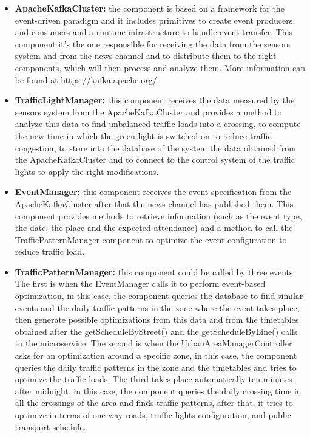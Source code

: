 \documentclass[12pt, a4paper, twoside, openright]{report}
\begin{document}
\begin{itemize}
\item
  \textbf{ApacheKafkaCluster:} the component is based on a framework for
  the event-driven paradigm and it includes primitives to create event
  producers and consumers and a runtime infrastructure to handle event
  transfer. This component it's the one responsible for receiving the data
  from the sensors system and from the news channel and to distribute
  them to the right components, which will then process and analyze them.
  More information can be found at \url{https://kafka.apache.org/}.
\item
  \textbf{TrafficLightManager:} this component receives the data
  measured by the sensors system from the ApacheKafkaCluster and
  provides a method to analyze this data to find unbalanced traffic loads
  into a crossing, to compute the new time in which the green light is
  switched on to reduce traffic congestion, to store into the database
  of the system the data obtained from the ApacheKafkaCluster and to
  connect to the control system of the traffic lights to apply the right
  modifications.
\item
  \textbf{EventManager:} this component receives the event specification
  from the ApacheKafkaCluster after that the news channel has published
  them. This component provides methods to retrieve information (such
  as the event type, the date, the place and the expected attendance)
  and a method to call the TrafficPatternManager component to optimize
  the event configuration to reduce traffic load.
\item
  \textbf{TrafficPatternManager:} this component could be called by
  three events. The first is when the EventManager calls it to perform
  event-based optimization, in this case, the component queries the
  database to find similar events and the daily traffic patterns in the
  zone where the event takes place, then generate possible optimizations
  from this data and from the timetables obtained after the
  getScheduleByStreet() and the getScheduleByLine() calls to the
  microservice. The second is when the UrbanAreaManagerController asks
  for an optimization around a specific zone, in this case, the component
  queries the daily traffic patterns in the zone and the timetables and
  tries to optimize the traffic loads. The third takes place
  automatically ten minutes after midnight, in this case, the
  component queries the daily crossing time in all the crossings of the
  area and finds traffic patterns, after that, it tries to optimize in
  terms of one-way roads, traffic lights configuration, and public
  transport schedule.
\end{itemize}
\end{document}
